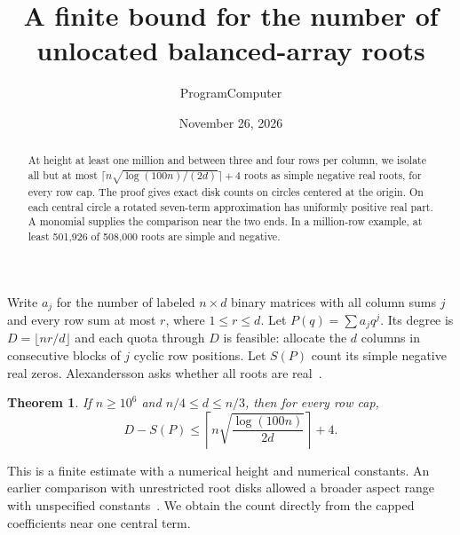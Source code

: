 \documentclass[11pt]{article}
\title{A finite bound for the number of unlocated balanced-array roots}
\author{ProgramComputer}
\date{November 26, 2026}
\newtheorem{theorem}{Theorem}
\begin{document}
\maketitle
\begin{abstract}
At height at least one million and between three and four rows per column, we isolate all but at most $\lceil n\sqrt{\log(100n)/(2d)}\rceil+4$ roots as simple negative real roots, for every row cap. The proof gives exact disk counts on circles centered at the origin. On each central circle a rotated seven-term approximation has uniformly positive real part. A monomial supplies the comparison near the two ends. In a million-row example, at least 501,926 of 508,000 roots are simple and negative.
\end{abstract}
Write $a_j$ for the number of labeled $n\times d$ binary matrices with all column sums $j$ and every row sum at most $r$, where $1\le r\le d$. Let $P(q)=\sum a_jq^j$. Its degree is $D=\lfloor nr/d\rfloor$ and each quota through $D$ is feasible: allocate the $d$ columns in consecutive blocks of $j$ cyclic row positions. Let $S(P)$ count its simple negative real zeros. Alexandersson asks whether all roots are real~\cite{original}.
\begin{theorem}\label{main}
If $n\ge10^6$ and $n/4\le d\le n/3$, then for every row cap,
\[
 D-S(P)\le \left\lceil n\sqrt{\frac{\log(100n)}{2d}}\right\rceil+4.
\]
\end{theorem}
This is a finite estimate with a numerical height and numerical constants. An earlier comparison with unrestricted root disks allowed a broader aspect range with unspecified constants~\cite{prior}. We obtain the count directly from the capped coefficients near one central term.
\end{document}
